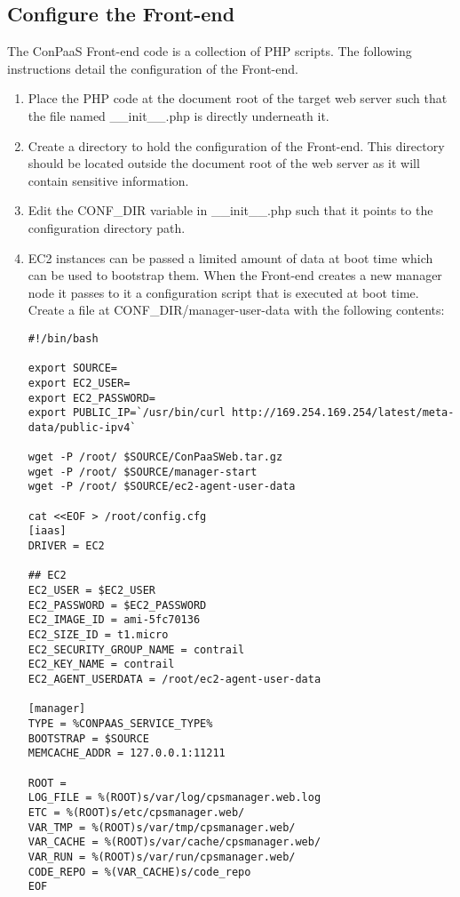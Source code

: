 \documentclass[12pt]{article}
\newenvironment{framedbox}[1]%
{\begin{framed}
 \begingroup
 \fontsize{#1}{#1}\selectfont
}
{
 \endgroup
 \end{framed}
}
\begin{document}
\subsection{Configure the Front-end}
The ConPaaS Front-end code is a collection of PHP scripts. The following
instructions detail the configuration of the Front-end.

\begin{enumerate}
\item Place the PHP code at the document root of the target web server such
      that the file named \_\_init\_\_.php is directly underneath it.
\item Create a directory to hold the configuration of the Front-end. This
      directory should be located outside the document root of the web server
      as it will contain sensitive information.
\item Edit the CONF\_DIR variable in \_\_init\_\_.php such that it points to the
      configuration directory path.

\item EC2 instances can be passed a limited amount of data at boot time which
can be used to bootstrap them. When the Front-end creates a new manager node it
passes to it a configuration script that is executed at boot time.
Create a file at CONF\_DIR/manager-user-data with the following contents:
\begin{framedbox}{8pt}\begin{verbatim}
#!/bin/bash

export SOURCE=
export EC2_USER=
export EC2_PASSWORD=
export PUBLIC_IP=`/usr/bin/curl http://169.254.169.254/latest/meta-data/public-ipv4`

wget -P /root/ $SOURCE/ConPaaSWeb.tar.gz
wget -P /root/ $SOURCE/manager-start
wget -P /root/ $SOURCE/ec2-agent-user-data

cat <<EOF > /root/config.cfg
[iaas]
DRIVER = EC2

## EC2
EC2_USER = $EC2_USER
EC2_PASSWORD = $EC2_PASSWORD
EC2_IMAGE_ID = ami-5fc70136
EC2_SIZE_ID = t1.micro
EC2_SECURITY_GROUP_NAME = contrail
EC2_KEY_NAME = contrail
EC2_AGENT_USERDATA = /root/ec2-agent-user-data

[manager]
TYPE = %CONPAAS_SERVICE_TYPE%
BOOTSTRAP = $SOURCE
MEMCACHE_ADDR = 127.0.0.1:11211

ROOT = 
LOG_FILE = %(ROOT)s/var/log/cpsmanager.web.log
ETC = %(ROOT)s/etc/cpsmanager.web/
VAR_TMP = %(ROOT)s/var/tmp/cpsmanager.web/
VAR_CACHE = %(ROOT)s/var/cache/cpsmanager.web/
VAR_RUN = %(ROOT)s/var/run/cpsmanager.web/
CODE_REPO = %(VAR_CACHE)s/code_repo
EOF


\end{verbatim}
\end{framedbox}
\end{enumerate}
\end{document}
